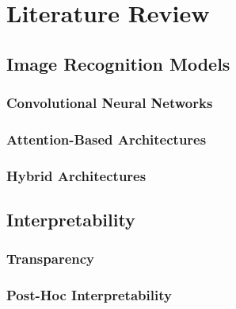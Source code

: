 \chapter*{Literature Review}
\label{ch:rel}

\section*{Image Recognition Models}
\label{rel:sec_imrecon}

\subsection*{Convolutional Neural Networks}
\label{rel:sub_cnn}

\subsection*{Attention-Based Architectures}
\label{rel:sub_att}

\subsection*{Hybrid Architectures}
\label{rel:sub_hybrid}

\section*{Interpretability}
\label{rel:sec_int}

\subsection*{Transparency}
\label{rel:sub_transp}

\subsection*{Post-Hoc Interpretability}
\label{rel:sub_post}


